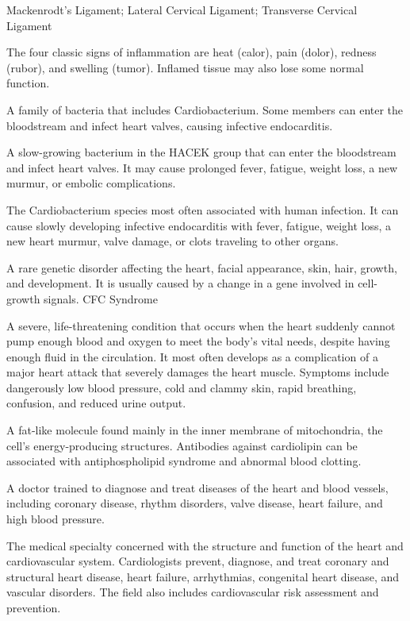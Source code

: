 \synonyms
Mackenrodt's Ligament; Lateral Cervical Ligament; Transverse Cervical Ligament

 The four classic signs of inflammation are heat (calor), pain (dolor), redness (rubor), and swelling (tumor). Inflamed tissue may also lose some normal function.


 A family of bacteria that includes Cardiobacterium. Some members can enter the bloodstream and infect heart valves, causing infective endocarditis.

 A slow-growing bacterium in the HACEK group that can enter the bloodstream and infect heart valves. It may cause prolonged fever, fatigue, weight loss, a new murmur, or embolic complications.

 The Cardiobacterium species most often associated with human infection. It can cause slowly developing infective endocarditis with fever, fatigue, weight loss, a new heart murmur, valve damage, or clots traveling to other organs.

 A rare genetic disorder affecting the heart, facial appearance, skin, hair, growth, and development. It is usually caused by a change in a gene involved in cell-growth signals.
\synonyms
CFC Syndrome

 A severe, life-threatening condition that occurs when the heart suddenly cannot pump enough blood and oxygen to meet the body's vital needs, despite having enough fluid in the circulation. It most often develops as a complication of a major heart attack that severely damages the heart muscle. Symptoms include dangerously low blood pressure, cold and clammy skin, rapid breathing, confusion, and reduced urine output.

 A fat-like molecule found mainly in the inner membrane of mitochondria, the cell's energy-producing structures. Antibodies against cardiolipin can be associated with antiphospholipid syndrome and abnormal blood clotting.

 A doctor trained to diagnose and treat diseases of the heart and blood vessels, including coronary disease, rhythm disorders, valve disease, heart failure, and high blood pressure.

 The medical specialty concerned with the structure and function of the heart and
cardiovascular system. Cardiologists prevent, diagnose, and treat coronary and structural
heart disease, heart failure, arrhythmias, congenital heart disease, and vascular disorders.
The field also includes cardiovascular risk assessment and prevention.

